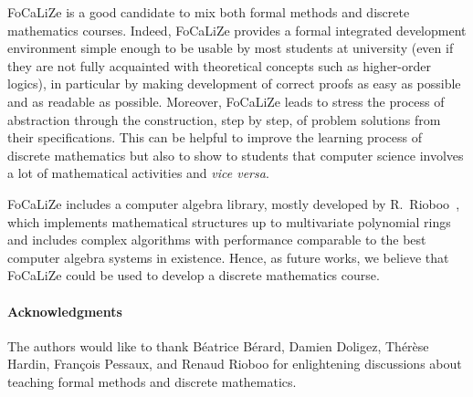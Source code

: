 \documentclass[submission,copyright,creativecommons]{eptcs}
\def\focalize{FoCaLiZe \mbox{}}
\begin{document}
\focalize is a good candidate to mix both formal
methods and discrete mathematics courses. Indeed,  \focalize provides
a formal integrated development environment simple enough to be 
usable by most students at university (even if they are not fully
acquainted with theoretical concepts such as 
higher-order logics), in particular by making development
of correct proofs as easy as possible and as readable  as possible.
Moreover, \focalize leads to stress the process of
abstraction through the construction, step by step, of problem
solutions from their specifications. This can be helpful
to improve the learning process of discrete mathematics but also to
show to students that
computer
science involves a lot of mathematical activities and {\it vice versa}.


\focalize includes a
computer algebra library, mostly developed by
R.~Rioboo~\cite{calc01,DBLP:journals/amai/Rioboo09}, which
implements mathematical structures up to multivariate 
polynomial rings and includes complex algorithms
with
performance comparable to the best computer algebra systems in
existence.
Hence, as future works, we believe that \focalize could be used 
to develop a discrete
mathematics course.









\paragraph{Acknowledgments}
The authors would like to thank B\'eatrice B\'erard, Damien Doligez, Th\'er\`ese Hardin,
Fran\c{c}ois Pessaux,  and Renaud Rioboo for enlightening discussions
about teaching formal methods and discrete mathematics.





\end{document}
